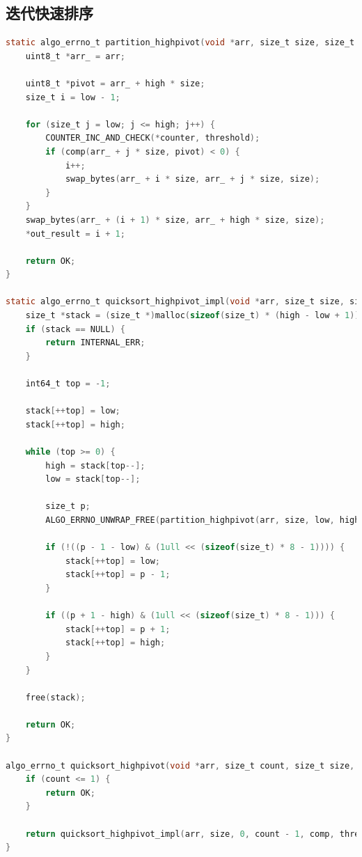 \documentclass[12pt]{article}
\begin{document}
\subsection{迭代快速排序}

\begin{lstlisting}[language=C]
static algo_errno_t partition_highpivot(void *arr, size_t size, size_t low, size_t high, comp_t comp, uint64_t threshold, uint64_t *counter, size_t *out_result) {
    uint8_t *arr_ = arr;

    uint8_t *pivot = arr_ + high * size;
    size_t i = low - 1;

    for (size_t j = low; j <= high; j++) {
        COUNTER_INC_AND_CHECK(*counter, threshold);
        if (comp(arr_ + j * size, pivot) < 0) {
            i++;
            swap_bytes(arr_ + i * size, arr_ + j * size, size);
        }
    }
    swap_bytes(arr_ + (i + 1) * size, arr_ + high * size, size);
    *out_result = i + 1;

    return OK;
}

static algo_errno_t quicksort_highpivot_impl(void *arr, size_t size, size_t low, size_t high, comp_t comp, uint64_t threshold, uint64_t *counter) {
    size_t *stack = (size_t *)malloc(sizeof(size_t) * (high - low + 1));
    if (stack == NULL) {
        return INTERNAL_ERR;
    }
    
    int64_t top = -1;

    stack[++top] = low;
    stack[++top] = high;

    while (top >= 0) {
        high = stack[top--];
        low = stack[top--];

        size_t p;
        ALGO_ERRNO_UNWRAP_FREE(partition_highpivot(arr, size, low, high, comp, threshold, counter, &p), stack);

        if (!((p - 1 - low) & (1ull << (sizeof(size_t) * 8 - 1)))) {
            stack[++top] = low;
            stack[++top] = p - 1;
        }

        if ((p + 1 - high) & (1ull << (sizeof(size_t) * 8 - 1))) {
            stack[++top] = p + 1;
            stack[++top] = high;
        }
    }

    free(stack);

    return OK;
}

algo_errno_t quicksort_highpivot(void *arr, size_t count, size_t size, comp_t comp, uint64_t threshold, uint64_t *out_counter) {
    if (count <= 1) {
        return OK;
    }

    return quicksort_highpivot_impl(arr, size, 0, count - 1, comp, threshold, out_counter);
}
\end{lstlisting}
\end{document}
